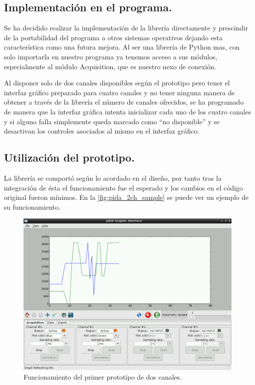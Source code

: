 	\subsection{Implementación en el programa.}
		Se ha decidido realizar la implementación de la librería directamente y prescindir de la portabilidad del programa a otros sistemas operativos dejando esta característica como una futura mejora. Al ser una librería de Python mas, con solo importarla en nuestro programa ya tenemos acceso a sus módulos, especialmente al módulo Acquisition, que es nuestro nexo de conexión.
		
		Al disponer solo de dos canales disponibles según el prototipo pero tener el interfaz gráfico preparado para cuatro canales y no tener ninguna manera de obtener a través de la librería el número de canales ofrecidos, se ha programado de manera que la interfaz gráfica intenta inicializar cada uno de los cuatro canales y si alguno falla simplemente queda marcado como ``no disponible'' y se desactivan los controles asociados al mismo en el interfaz gráfico. 
		
		\subsection{Utilización del prototipo.}
		La librería se comportó según lo acordado en el diseño, por tanto tras la integración de ésta el funcionamiento fue el esperado y los cambios en el código original fueron mínimos. En la \autoref{fig:pida_2ch_sample} se puede ver un ejemplo de su funcionamiento.
		
	\begin{figure}[H]
			\centering
		  	\includegraphics[width=1\textwidth]{img/pida_2ch_sample.png}
  			\caption{Funcionamiento del primer prototipo de dos canales.}\label{fig:pida_2ch_sample}
		\end{figure}
